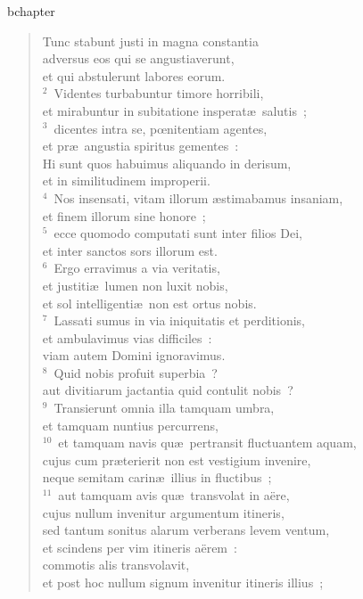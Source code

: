 bchapter\begin{verse}\vspace{-19pt}Tunc stabunt justi in magna constantia\\ adversus eos qui se angustiaverunt,\\ et qui abstulerunt labores eorum.\\
${}^{2}$~Videntes turbabuntur timore horribili,\\ et mirabuntur in subitatione insperat\ae\ salutis~;\\
${}^{3}$~dicentes intra se, pœnitentiam agentes,\\ et pr\ae\ angustia spiritus gementes~:\\ Hi sunt quos habuimus aliquando in derisum,\\ et in similitudinem improperii.\\
${}^{4}$~Nos insensati, vitam illorum \ae stimabamus insaniam,\\ et finem illorum sine honore~;\\
${}^{5}$~ecce quomodo computati sunt inter filios Dei,\\ et inter sanctos sors illorum est.\\
${}^{6}$~Ergo erravimus a via veritatis,\\ et justiti\ae\ lumen non luxit nobis,\\ et sol intelligenti\ae\ non est ortus nobis.\\
${}^{7}$~Lassati sumus in via iniquitatis et perditionis,\\ et ambulavimus vias difficiles~:\\ viam autem Domini ignoravimus.\\
${}^{8}$~Quid nobis profuit superbia~?\\ aut divitiarum jactantia quid contulit nobis~?\\
${}^{9}$~Transierunt omnia illa tamquam umbra,\\ et tamquam nuntius percurrens,\\
${}^{10}$~et tamquam navis qu\ae\ pertransit fluctuantem aquam,\\ cujus cum pr\ae terierit non est vestigium invenire,\\ neque semitam carin\ae\ illius in fluctibus~;\\
${}^{11}$~aut tamquam avis qu\ae\ transvolat in a\"ere,\\ cujus nullum invenitur argumentum itineris,\\ sed tantum sonitus alarum verberans levem ventum,\\ et scindens per vim itineris a\"erem~:\\ commotis alis transvolavit,\\ et post hoc nullum signum invenitur itineris illius~;\\

\end{verse}

